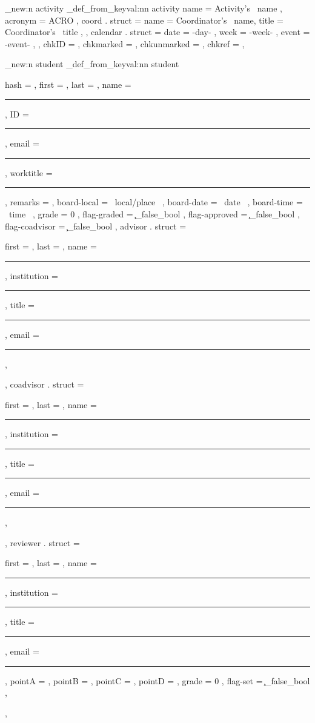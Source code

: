 \documentclass[10pt]{article}
\begin{document}
\begin{codestore}
\starray_new:n {activity}
\starray_def_from_keyval:nn {activity} {
    name = Activity's~ name ,
    acronym = ACRO ,
    coord . struct =  {
        name = Coordinator's~ name,
        title = Coordinator's~ title ,
      } ,
    calendar . struct = {
        date = {-day-} ,
        week = {-week-} ,
        event = {-event-} ,
      } ,
    chkID = ,        %
    chkmarked = ,    %
    chkunmarked = ,  %
    chkref = ,       %
  }
\end{codestore}


\begin{codestore}
\starray_new:n {student}
\starray_def_from_keyval:nn {student}
 {
  hash = , %
  first = ,
  last = ,
  name = \rule{\l__stdemo.name_rule_dim}{.1pt} ,
  ID    = \rule{\l__stdemo.ID_rule_dim}{.1pt} , 
  email = \rule{\l__stdemo.email_rule_dim}{.1pt} ,
  worktitle = \rule{\l__stdemo.worktitle_rule_dim}{.1pt} ,
  remarks = ,
  board-local = {~local/place~} ,
  board-date   = {~date~} ,
  board-time  = {~time~} ,
  grade = 0 ,
  flag-graded = \c_false_bool , %
  flag-approved = \c_false_bool ,
  flag-coadvisor = \c_false_bool ,
  advisor . struct = {
    first = ,
    last =  ,
    name = \rule{\l__stdemo.name_rule_dim}{.1pt},
    institution = \rule{\l__stdemo.name_rule_dim}{.1pt},
    title = \rule{\l__stdemo.title_rule_dim}{.1pt} ,
    email = \rule{\l__stdemo.email_rule_dim}{.1pt} ,
  } ,
  coadvisor . struct = {
    first = ,
    last =  ,
    name = \rule{\l__stdemo.name_rule_dim}{.1pt},
    institution = \rule{\l__stdemo.name_rule_dim}{.1pt},
    title = \rule{\l__stdemo.title_rule_dim}{.1pt} ,
    email = \rule{\l__stdemo.email_rule_dim}{.1pt} ,
  } ,
  reviewer . struct = {
    first = ,
    last =  ,
    name = \rule{\l__stdemo.name_rule_dim}{.1pt},
    institution = \rule{\l__stdemo.name_rule_dim}{.1pt},
    title = \rule{\l__stdemo.title_rule_dim}{.1pt} ,
    email = \rule{\l__stdemo.email_rule_dim}{.1pt} ,
    pointA = ,
    pointB = ,
    pointC = ,
    pointD = ,
    grade = 0 ,
    flag-set = \c_false_bool , 
  } ,
 }
\end{codestore}

\begin{codestore}[DataRecovery]
\end{codestore}
\end{document}
